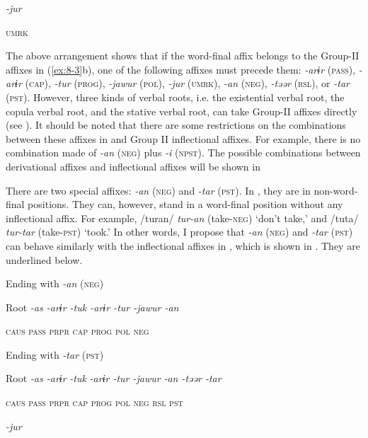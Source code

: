           \textit{-jur}

          \textsc{umrk}
\z

The above arrangement shows that if the word-final affix belongs to the Group-II affixes in (\ref{ex:8-3}b), one of the following affixes must precede them: \textit{-arɨr} (\textsc{pass}), \textit{-arɨr} (\textsc{cap}), \textit{-tur} (\textsc{prog}), \textit{-jawur} (\textsc{pol}), \textit{-jur} (\textsc{umrk}), \textit{-an} (\textsc{neg}), \textit{-təər} (\textsc{rsl}), or \textit{-tar} (\textsc{pst}). However, three kinds of verbal roots, i.e. the existential verbal root, the copula verbal root, and the stative verbal root, can take Group-II affixes directly (see ). It should be noted that there are some restrictions on the combinations between these affixes in  and Group II inflectional affixes. For example, there is no combination made of \textit{-an} (\textsc{neg}) plus \textit{-i} (\textsc{npst}). The possible combinations between derivational affixes and inflectional affixes will be shown in 

There are two special affixes: \textit{-an} (\textsc{neg}) and \textit{-tar} (\textsc{pst}). In , they are in non-word-final positions. They can, however, stand in a word-final position without any inflectional affix. For example, /turan/ \textit{tur-an} (take-\textsc{neg}) ‘don’t take,’ and /tuta/ \textit{tur-tar} (take-\textsc{pst}) ‘took.’ In other words, I propose that \textit{-an} (\textsc{neg}) and \textit{-tar} (\textsc{pst}) can behave similarly with the inflectional affixes in , which is shown in . They are underlined below.

\ea\label{ex:8-6}
\ea Ending with \textit{-an} (\textsc{neg})

    Root  \textit{-as  -arɨr  -tuk  -arɨr  -tur  -jawur  -an}

      \textsc{caus}  \textsc{pass}  \textsc{prpr}  \textsc{cap}  \textsc{prog}  \textsc{pol}  \textsc{neg}


\ex Ending with \textit{-tar} (\textsc{pst})

    Root  \textit{-as  -arɨr} %
\textit{-tuk}  \textit{-arɨr  -tur  -jawur} %
\textit{-an  -təər  -tar}

      \textsc{caus}  \textsc{pass}  \textsc{prpr}  \textsc{cap}  \textsc{prog}  \textsc{pol}  \textsc{neg}  \textsc{rsl}  \textsc{pst}

            \textit{-jur}

